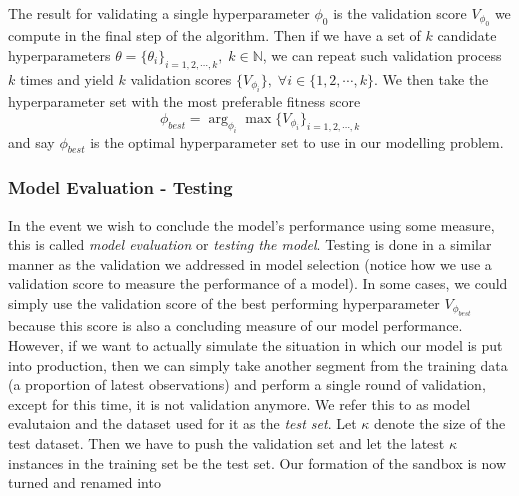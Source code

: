 The result for validating a single hyperparameter $\phi_0$ is the validation score $V_{\phi_0}$ we compute in the final step of the algorithm. Then if we have a set of $k$ candidate hyperparameters $\theta = \{ \theta_i \}_{i = 1, 2, \cdots, k}, \; k \in \mathbb{N}$, we can repeat such validation process $k$ times and yield $k$ validation scores $\{ V_{\phi_i} \}, \; \forall i \in \{1, 2, \cdots, k \}$. We then take the hyperparameter set with the most preferable fitness score
\begin{equation*} 
    \phi_{best} = \arg_{\phi_i} \max \{ V_{\phi_i} \}_{i = 1, 2, \cdots, k}
\end{equation*}
and say $\phi_{best}$ is the optimal hyperparameter set to use in our modelling problem.

\subsubsection{Model Evaluation - Testing}
In the event we wish to conclude the model's performance using some measure, this is called \textit{model evaluation} or \textit{testing the model}. Testing is done in a similar manner as the validation we addressed in model selection (notice how we use a validation score to measure the performance of a model). In some cases, we could simply use the validation score of the best performing hyperparameter $V_{\phi_{best}}$ because this score is also a concluding measure of our model performance. However, if we want to actually simulate the situation in which our model is put into production, then we can simply take another segment from the training data (a proportion of latest observations) and perform a single round of validation, except for this time, it is not validation anymore. We refer this to as model evalutaion and the dataset used for it as the \textit{test set}. Let $\kappa$ denote the size of the test dataset. Then we have to push the validation set and let the latest $\kappa$ instances in the training set be the test set. Our formation of the sandbox is now turned and renamed into
